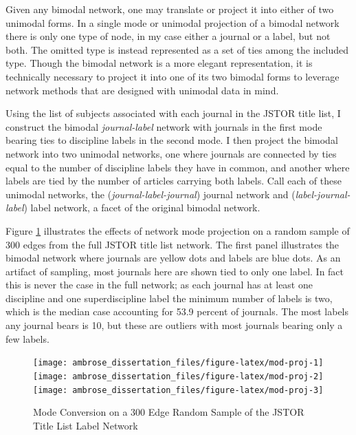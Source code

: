 \documentclass[]{book}
\theoremstyle{definition}
\theoremstyle{definition}
\theoremstyle{definition}
\theoremstyle{remark}
\begin{document}
Given any bimodal network, one may translate or project it into either
of two unimodal forms. In a single mode or unimodal projection of a
bimodal network there is only one type of node, in my case either a
journal or a label, but not both. The omitted type is instead
represented as a set of ties among the included type. Though the bimodal
network is a more elegant representation, it is technically necessary to
project it into one of its two bimodal forms to leverage network methods
that are designed with unimodal data in mind.

Using the list of subjects associated with each journal in the JSTOR
title list, I construct the bimodal \emph{journal-label} network with
journals in the first mode bearing ties to discipline labels in the
second mode. I then project the bimodal network into two unimodal
networks, one where journals are connected by ties equal to the number
of discipline labels they have in common, and another where labels are
tied by the number of articles carrying both labels. Call each of these
unimodal networks, the (\emph{journal-label-journal}) journal network
and (\emph{label-journal-label}) label network, a facet of the original
bimodal network.

Figure \ref{fig:mod-proj} illustrates the effects of network mode
projection on a random sample of 300 edges from the full JSTOR title
list network. The first panel illustrates the bimodal network where
journals are yellow dots and labels are blue dots. As an artifact of
sampling, most journals here are shown tied to only one label. In fact
this is never the case in the full network; as each journal has at least
one discipline and one superdiscipline label the minimum number of
labels is two, which is the median case accounting for 53.9 percent of
journals. The most labels any journal bears is 10, but these are
outliers with most journals bearing only a few labels.

\begin{figure}

{\centering \texttt{[image: ambrose\_dissertation\_files/figure-latex/mod-proj-1]} \texttt{[image: ambrose\_dissertation\_files/figure-latex/mod-proj-2]} \texttt{[image: ambrose\_dissertation\_files/figure-latex/mod-proj-3]} 

}

\caption{Mode Conversion on a 300 Edge Random Sample of the JSTOR Title List Label Network}\label{fig:mod-proj}
\end{figure}
\end{document}
